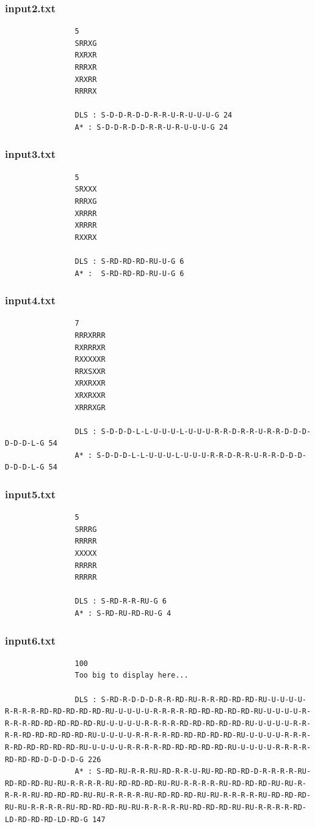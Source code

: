 \documentclass{article}
\begin{document}
	\subsubsection{input2.txt}
		\begin{lstlisting}
				5
				SRRXG
				RXRXR
				RRRXR
				XRXRR
				RRRRX
				
				DLS : S-D-D-R-D-D-R-R-U-R-U-U-U-G 24
				A* : S-D-D-R-D-D-R-R-U-R-U-U-U-G 24
		\end{lstlisting}
	
	\subsubsection{input3.txt}
		\begin{lstlisting}
				5
				SRXXX
				RRRXG
				XRRRR
				XRRRR
				RXXRX
		
				DLS : S-RD-RD-RD-RU-U-G 6
				A* :  S-RD-RD-RD-RU-U-G 6
		\end{lstlisting}
	
	\subsubsection{input4.txt}
		\begin{lstlisting}
				7
				RRRXRRR
				RXRRRXR
				RXXXXXR
				RRXSXXR
				XRXRXXR
				XRXRXXR
				XRRRXGR
				
				DLS : S-D-D-D-L-L-U-U-U-L-U-U-U-R-R-D-R-R-U-R-R-D-D-D-D-D-D-L-G 54
				A* : S-D-D-D-L-L-U-U-U-L-U-U-U-R-R-D-R-R-U-R-R-D-D-D-D-D-D-L-G 54
		\end{lstlisting}
	
	\subsubsection{input5.txt}
		\begin{lstlisting}
				5
				SRRRG
				RRRRR
				XXXXX
				RRRRR
				RRRRR
				
				DLS : S-RD-R-R-RU-G 6
				A* : S-RD-RU-RD-RU-G 4
		\end{lstlisting}
	
	\subsubsection{input6.txt}
		\begin{lstlisting}
				100
				Too big to display here...
				
				DLS : S-RD-R-D-D-D-R-R-RD-RU-R-R-RD-RD-RD-RU-U-U-U-U-R-R-R-R-RD-RD-RD-RD-RD-RU-U-U-U-U-R-R-R-R-RD-RD-RD-RD-RD-RU-U-U-U-U-R-R-R-R-RD-RD-RD-RD-RD-RU-U-U-U-U-R-R-R-R-RD-RD-RD-RD-RD-RU-U-U-U-U-R-R-R-R-RD-RD-RD-RD-RD-RU-U-U-U-U-R-R-R-R-RD-RD-RD-RD-RD-RU-U-U-U-U-R-R-R-R-RD-RD-RD-RD-RD-RU-U-U-U-U-R-R-R-R-RD-RD-RD-RD-RD-RU-U-U-U-U-R-R-R-R-RD-RD-RD-D-D-D-D-G 226
				A* : S-RD-RU-R-R-RU-RD-R-R-U-RU-RD-RD-RD-D-R-R-R-R-RU-RD-RD-RD-RU-RU-R-R-R-R-RU-RD-RD-RD-RU-RU-R-R-R-R-RU-RD-RD-RD-RU-RU-R-R-R-R-RU-RD-RD-RD-RU-RU-R-R-R-R-RU-RD-RD-RD-RU-RU-R-R-R-R-RU-RD-RD-RD-RU-RU-R-R-R-R-RU-RD-RD-RD-RU-RU-R-R-R-R-RU-RD-RD-RD-RU-RU-R-R-R-R-RD-LD-RD-RD-RD-LD-RD-G 147
		\end{lstlisting}
	\newpage
\end{document}
